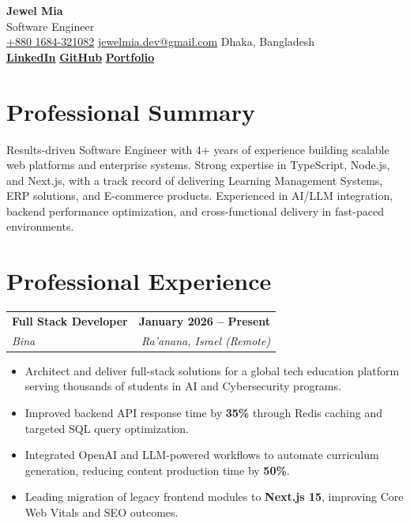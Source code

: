 \documentclass[letterpaper,11pt]{article}
\makeatletter
\newcommand{\contactSep}{\enspace\textbar\enspace}
\newcommand{\resumeSubheading}[4]{%
  \vspace{1.5pt}
  \begin{tabularx}{\linewidth}{@{}X r@{}}
    \textbf{#1} & \textbf{#2} \\
    \textit{#3} & \textit{#4}
  \end{tabularx}
  \vspace{1pt}
}
\newcommand{\resumeItem}[1]{\item #1}
\newenvironment{resumeItemList}{%
  \begin{itemize}[leftmargin=0.19in, label=\textbullet, itemsep=2pt, topsep=2pt, parsep=0pt]
}{%
  \end{itemize}
}
\makeatother
\begin{document}
\begin{center}
  {\fontsize{24pt}{26pt}\selectfont\bfseries Jewel Mia}\\[3pt]
  {\fontsize{12pt}{14pt}\selectfont Software Engineer}\\[5pt]
  \href{tel:+8801684321082}{+880 1684-321082}
  \contactSep
  \href{mailto:jewelmia.dev@gmail.com}{jewelmia.dev@gmail.com}
  \contactSep
  Dhaka, Bangladesh\\[2pt]
  \textbf{\href{https://www.linkedin.com/in/jewel-mia/}{LinkedIn}}
  \contactSep
  \textbf{\href{https://github.com/jewel1269}{GitHub}}
  \contactSep
  \textbf{\href{https://www.learnwithjewel.xyz/}{Portfolio}}
\end{center}

\section{Professional Summary}
Results-driven Software Engineer with 4+ years of experience building scalable web platforms and enterprise systems. Strong expertise in TypeScript, Node.js, and Next.js, with a track record of delivering Learning Management Systems, ERP solutions, and E-commerce products. Experienced in AI/LLM integration, backend performance optimization, and cross-functional delivery in fast-paced environments.

\section{Professional Experience}

\resumeSubheading
  {Full Stack Developer}{January 2026 -- Present}
  {Bina}{Ra'anana, Israel (Remote)}
\begin{resumeItemList}
  \resumeItem{Architect and deliver full-stack solutions for a global tech education platform serving thousands of students in AI and Cybersecurity programs.}
  \resumeItem{Improved backend API response time by \textbf{35\%} through Redis caching and targeted SQL query optimization.}
  \resumeItem{Integrated OpenAI and LLM-powered workflows to automate curriculum generation, reducing content production time by \textbf{50\%}.}
  \resumeItem{Leading migration of legacy frontend modules to \textbf{Next.js 15}, improving Core Web Vitals and SEO outcomes.}
\end{resumeItemList}
\end{document}
